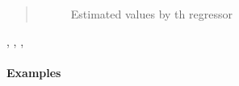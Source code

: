 \documentclass[letterpaper,10pt,english]{sphinxmanual}
\begin{document}
\begin{fulllineitems}
\begin{quote}
\begin{description}
\begin{description}
\item[{}] \leavevmode
Estimated values by th regressor

\end{description}

\end{description}\end{quote}




{\hyperref[\detokenize{_modules/nlrob:nlrob.nlrob_MM}]{}}, {\hyperref[\detokenize{_modules/nlrob:nlrob.nlrob_tau}]{}}, {\hyperref[\detokenize{_modules/nlrob:nlrob.nlrob_CM}]{}}, {\hyperref[\detokenize{_modules/nlrob:nlrob.nlrob_mtl}]{}}


\paragraph{Examples}


\end{fulllineitems}
\end{document}
